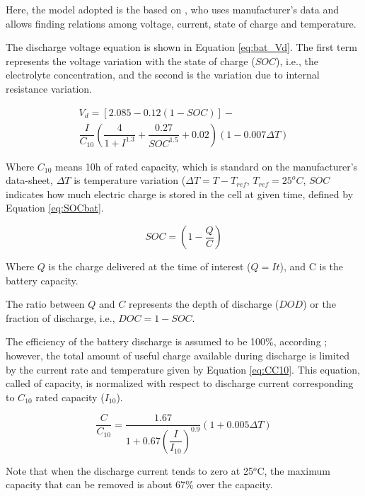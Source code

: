 \documentclass[journal]{IEEEtran}
\begin{document}
Here, the model adopted is the based on \cite{Copetti}, who uses manufacturer's data and allows finding relations among voltage, current, state of charge and temperature. 

The discharge voltage equation is shown in Equation \ref{eq:bat_Vd}. The first term represents the voltage variation with the state of charge ($ SOC $), i.e., the electrolyte concentration, and the second is the variation due to internal resistance variation.

\begin{multline}
\label{eq:bat_Vd}
V_{d} = \left[ 2.085-0.12(1-SOC) \right] - \\ \dfrac{I}{C_{10}} \left( \dfrac{4}{1+I^{1.3}} + \dfrac{0.27}{SOC^{1.5}}+0.02 \right) (1-0.007 \Delta T)
\end{multline}

Where $ C_{10} $ means 10h of rated capacity, which is standard on the manufacturer's data-sheet, $ \Delta T $ is temperature variation ($ \Delta T=T-T_{ref} $, $ T_{ref}=25^{o}C $, $ SOC $ indicates how much electric charge is stored in the cell at given time, defined by Equation \ref{eq:SOCbat}.

\begin{equation}
\label{eq:SOCbat}
SOC = \left( 1 - \dfrac{Q}{C} \right) 
\end{equation}

Where $ Q $ is the charge delivered at the time of interest ($ Q=It $), and C is the battery capacity.

The ratio between $ Q $ and $ C $ represents the depth of discharge ($ DOD $) or the fraction of discharge, i.e., $ DOC=1-SOC $.

The efficiency of the battery discharge is assumed to be 100\%, according \cite{Copetti}; however, the total amount of useful charge available during discharge is limited by the current rate and temperature given by Equation \ref{eq:CC10}. This equation, called of capacity, is normalized with respect to discharge current corresponding to $ C_{10} $ rated capacity ($ I_{10} $).

\begin{equation}
\label{eq:CC10}
\dfrac{C}{C_{10}} = \dfrac{1.67}{1+0.67 \left( \dfrac{I}{I_{10}} \right)^{0.9} }(1+0.005 \Delta T)
\end{equation}

Note that when the discharge current tends to zero at 25$^{o}$C, the maximum capacity that can be removed is about 67\% over the capacity.
\end{document}

